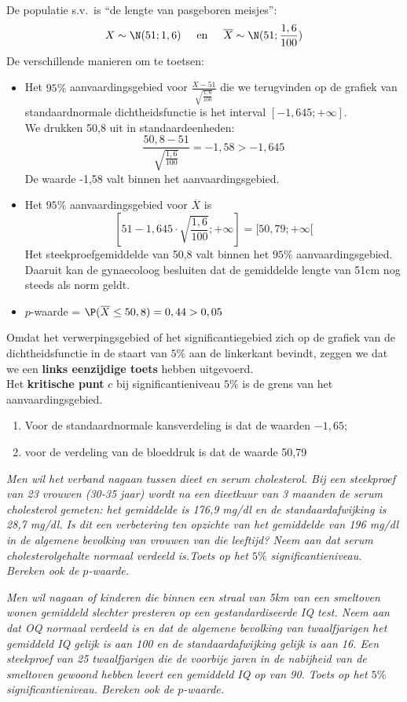 {\begin{enumerate}
De populatie s.v.\ is ``de lengte van pasgeboren meisjes'':
$$X\sim \N(51;1,6)\hspace{0,5cm}\mbox{en}\hspace{0,5cm}\overline{X}\sim \N(51;\frac{1,6}{100})$$
De verschillende manieren om te toetsen:
\begin{itemize}
 \item Het $95\%$ aanvaardingsgebied  voor $\frac{\overline{X}-51}{\sqrt{\frac{1,6}{100}}}$ die we terugvinden  op de grafiek van standaardnormale dichtheidsfunctie  is het interval $[-1,645;+\infty]$. \\We drukken 50,8 uit in standaardeenheden:
$$\frac{50,8-51}{\sqrt{\frac{1,6}{100}}}=-1,58>-1,645$$
De waarde -1,58 valt binnen het aanvaardingsgebied. 
\item Het $95\%$ aanvaardingsgebied voor $\overline{X}$ is
$$[51-1,645\cdot\sqrt{\frac{1,6}{100}};+\infty]=[50,79;+\infty[$$
Het steekproefgemiddelde van 50,8 valt  binnen het $95\%$ aanvaardingsgebied. Daaruit kan de gynaecoloog besluiten dat de gemiddelde lengte van 51\;cm nog steeds als norm geldt. 
\item $p$-waarde = $\P(\overline{X}\leq 50,8)=0,44>0,05$
\end{itemize}
Omdat het verwerpingsgebied  of het significantiegebied zich op de grafiek van de dichtheidsfunctie in de  staart van $5\%$ aan de linkerkant bevindt, zeggen we dat  we een \textbf{links eenzijdige toets} hebben uitgevoerd. \\
Het {\bf kritische punt} $c$ bij significantieniveau $5\%$ is de grens van het aanvaardingsgebied.
\begin{enumerate}
 \item Voor de standaardnormale kansverdeling is dat de waarden $-1,65$;
\item voor de verdeling van de  bloeddruk is dat de waarde 50,79 
\end{enumerate}
\end{enumerate}
{\footnotesize
\begin{Opgave}\label{chol1}
 \em Men wil het verband nagaan tussen dieet en serum cholesterol. Bij een steekproef van 23 vrouwen (30-35 jaar) wordt na een dieetkuur van 3 maanden de serum cholesterol gemeten: het gemiddelde is 176,9 mg/dl en de standaardafwijking is 28,7 mg/dl. Is dit een verbetering ten opzichte van het gemiddelde van 196 mg/dl in de algemene bevolking van vrouwen van die leeftijd? Neem aan dat serum cholesterolgehalte normaal verdeeld is.Toets op het $5\%$ significantieniveau. Bereken ook de $p$-waarde.
\end{Opgave}
\begin{opgave}\label{chol2}
 \em Men wil nagaan of kinderen die binnen een straal van 5\;km van een smeltoven wonen gemiddeld slechter presteren op een gestandardiseerde IQ test. Neem aan dat OQ normaal verdeeld is en dat de algemene bevolking van twaalfjarigen het gemiddeld IQ gelijk is aan 100 en de standaardafwijking gelijk is aan 16. Een steekproef van 25 twaalfjarigen die de voorbije jaren in de nabijheid van de smeltoven gewoond hebben levert een gemiddeld IQ op van 90. Toets op het $5\%$ significantieniveau. Bereken ook de $p$-waarde.
\end{opgave}

}}
